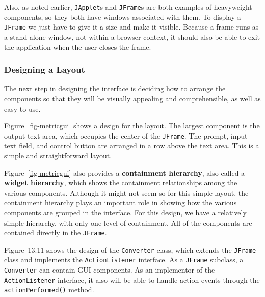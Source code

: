 Also, as noted earlier, {\tt JApplet}s and {\tt JFrame}s are both
examples of heavyweight components, so they both have windows
associated with them.  To display a {\tt JFrame} we just have to give
it a size and make it visible.  Because a frame runs as a stand-alone
window, not within a browser context, it should also be able to exit
the application when the user closes the frame.

\subsubsection*{Designing a Layout}
\noindent The next step in designing the interface is deciding how to arrange the
components so that they will be visually appealing and comprehensible,
as well as easy to use.
\begin{figure}[b]
\end{figure}

Figure~\ref{fig-metricgui} shows a design for the layout. The largest
component is the output text area, which occupies the center of the
{\tt JFrame}. The prompt, input text field, and control button are
arranged in a row above the text area.  This is a simple and
straightforward layout.

Figure~\ref{fig-metricgui} also provides a {\bf containment
hierarchy}, also called a {\bf widget
hierarchy}, which shows the containment
relationships among the various components.  Although it might not
seem so for this simple layout, the containment hierarchy plays an
important role in showing how the various components are grouped
in the interface.  For this design, we have a relatively
simple hierarchy, with only one level of containment.  All of the
components are contained directly in the {\tt JFrame}.

\pagebreak
Figure~13.11 shows the design of the {\tt Converter} class, which
extends the {\tt JFrame} class and implements the {\tt ActionListener}
interface.  As a {\tt JFrame} subclass, a {\tt Converter} can contain
GUI components.  As an implementor of the {\tt ActionListener}
interface, it also will be able to handle action events through the {\tt
actionPerformed()} method.

